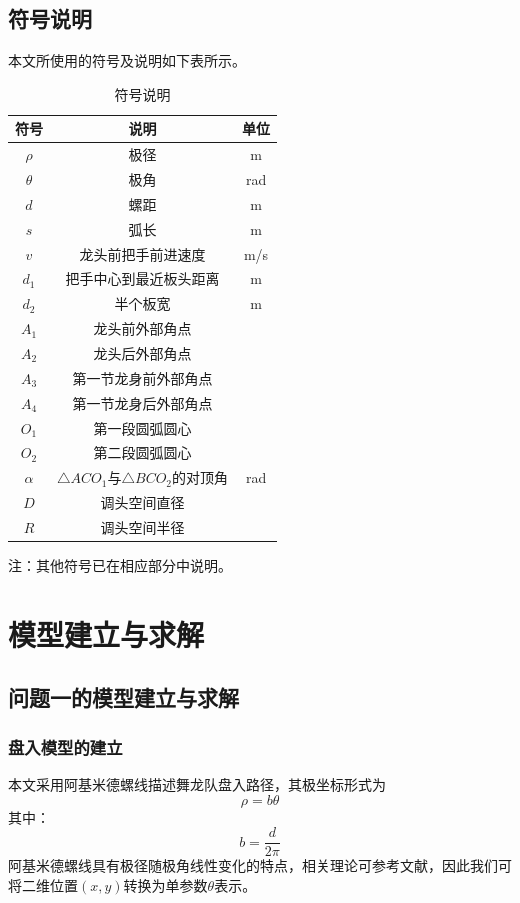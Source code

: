 \documentclass[UTF-8,a4paper,zihao=-4]{ctexart}
\begin{document}
\subsection{符号说明}
本文所使用的符号及说明如下表所示。
\begin{table}[htbp]
\centering
{}

\caption{符号说明}
\begin{tabular}{ccc}
\toprule
符号 & 说明 & 单位 \\
\midrule
$\rho$ & 极径 & m \\
$\theta$ & 极角 & rad \\
$d$ & 螺距 & m \\
$s$ & 弧长 & m \\
$v$ & 龙头前把手前进速度 & m/s \\
$d_1$ & 把手中心到最近板头距离 & m \\
$d_2$ & 半个板宽 & m \\
$A_1$ & 龙头前外部角点 & \\
$A_2$ & 龙头后外部角点 & \\
$A_3$ & 第一节龙身前外部角点 & \\
$A_4$ & 第一节龙身后外部角点 & \\
$O_1$ & 第一段圆弧圆心 & \\
$O_2$ & 第二段圆弧圆心 & \\
$\alpha$ & $\triangle ACO_1$与$\triangle BCO_2$的对顶角 & rad \\
$D$ & 调头空间直径 & \\
$R$ & 调头空间半径 & \\
\bottomrule
\end{tabular}

\vspace{0.5em}
\parbox{0.9\textwidth}{
注：其他符号已在相应部分中说明。
}
\end{table}
\FloatBarrier
\section{模型建立与求解}
\subsection{问题一的模型建立与求解}
\subsubsection{盘入模型的建立}

本文采用阿基米德螺线描述舞龙队盘入路径，其极坐标形式为
\begin{equation}
    \rho=b\theta
\end{equation}
其中：
\begin{equation}
    b=\frac{d}{2\pi}
\end{equation}
阿基米德螺线具有极径随极角线性变化的特点，相关理论可参考文献\cite{archimedes_spiral}，因此我们可将二维位置$(x,y)$转换为单参数$\theta$表示。
\end{document}
